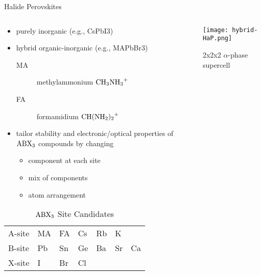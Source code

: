 \documentclass[10pt, aspectratio=169, presentation]{beamer}
\begin{document}
\begin{frame}[label={sec:orgc3c1ee5}]{Halide Perovskites}
\begin{columns}
\begin{column}{0.6\columnwidth}
\begin{itemize}
\item purely inorganic (e.g., CsPbI3)
\item hybrid organic-inorganic (e.g., MAPbBr3)
\begin{description}
\item[{MA}] methylammonium \(\ce{CH3NH3+}\)
\item[{FA}] formamidium \(\ce{CH(NH2)2+}\)
\end{description}
\item tailor stability and electronic/optical properties of \(\ce{ABX3}\)
compounds by changing
\begin{itemize}
\item component at each site
\item mix of components
\item atom arrangement
\end{itemize}
\end{itemize}

\begin{table}[htbp]
\caption{\(\ce{ABX3}\) Site Candidates}
\centering
\begin{tabular}{l|llllll}
A-site & MA & FA & Cs & Rb & K & \\[0pt]
B-site & Pb & Sn & Ge & Ba & Sr & Ca\\[0pt]
X-site & I & Br & Cl &  &  & \\[0pt]
\end{tabular}
\end{table}
\end{column}

\begin{column}{0.4\columnwidth}
\begin{center}
\texttt{[image: hybrid-HaP.png]}
\end{center}

\center{}2x2x2 \(\alpha\)-phase supercell 
\end{column}
\end{columns}
\end{frame}
\end{document}
